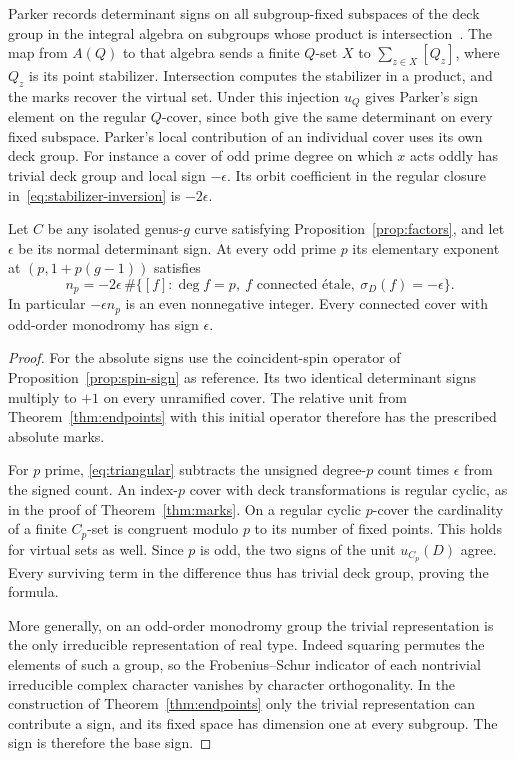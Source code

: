 \begin{remark}
Parker records determinant signs on all subgroup-fixed subspaces of
the deck group in the integral algebra on subgroups whose product
is intersection~\cite[Definitions~1.1--1.2 and Lemma~1.3]{parker}.
The map from $A(Q)$ to that algebra sends a finite $Q$-set $X$ to
$\sum_{z\in X}[Q_z]$, where $Q_z$ is its point stabilizer.
Intersection computes the stabilizer in a product, and the marks
recover the virtual set. Under this injection $u_Q$ gives Parker's
sign element on the regular $Q$-cover, since both give the same
determinant on every fixed subspace. Parker's local contribution of
an individual cover uses its own deck group. For instance a cover
of odd prime degree on which $x$ acts oddly has trivial deck group
and local sign $-\epsilon$. Its orbit coefficient in the regular
closure in~\eqref{eq:stabilizer-inversion} is $-2\epsilon$.
\end{remark}

\begin{corollary}\label{cor:general-sign}
Let $C$ be any isolated genus-$g$ curve satisfying
Proposition~\ref{prop:factors}, and let $\epsilon$ be its normal
determinant sign. At every odd prime $p$ its elementary exponent
at $(p,1+p(g-1))$ satisfies
\[
 n_p=-2\epsilon\,\#\{[f]:\deg f=p,\ f\text{ connected \'etale},
                      \ \sigma_D(f)=-\epsilon\}.
\]
In particular $-\epsilon n_p$ is an even nonnegative integer.
Every connected cover with odd-order monodromy has sign $\epsilon$.
\end{corollary}

\begin{proof}
For the absolute signs use the coincident-spin operator of
Proposition~\ref{prop:spin-sign} as reference. Its two identical
determinant signs multiply to $+1$ on every unramified cover.
The relative unit from Theorem~\ref{thm:endpoints} with this initial
operator therefore has the prescribed absolute marks.

For $p$ prime, \eqref{eq:triangular} subtracts the unsigned degree-$p$
count times $\epsilon$ from the signed count. An index-$p$ cover
with deck transformations is regular cyclic, as in the proof of
Theorem~\ref{thm:marks}. On a regular cyclic $p$-cover the cardinality
of a finite $C_p$-set is congruent modulo $p$ to its number of fixed
points. This holds for virtual sets as well. Since $p$ is odd, the
two signs of the unit $u_{C_p}(D)$ agree. Every surviving term in the
difference thus has trivial deck group, proving the formula.

More generally, on an odd-order monodromy group the trivial representation
is the only irreducible representation of real type. Indeed squaring
permutes the elements of such a group, so the Frobenius--Schur indicator
of each nontrivial irreducible complex character vanishes by character
orthogonality. In the construction of Theorem~\ref{thm:endpoints} only
the trivial representation can contribute a sign, and its fixed space
has dimension one at every subgroup. The sign is therefore the base sign.
\end{proof}

